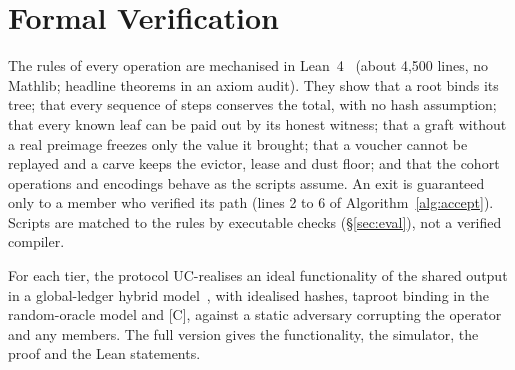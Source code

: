 \section{Formal Verification}\label{sec:proved}

The rules of every operation are mechanised in Lean~4~\cite{lean4}
(about 4{,}500 lines, no Mathlib; \LeanTheoremCount{} headline theorems
in an axiom audit). They show that a root binds its tree; that every
sequence of steps conserves the total, with no hash assumption; that
every known leaf can be paid out by its honest witness; that a graft
without a real preimage freezes only the value it brought; that a
voucher cannot be replayed and a carve keeps the evictor, lease and dust
floor; and that the cohort operations and encodings behave as the
scripts assume. An exit is guaranteed only to a member who verified its
path (lines 2 to 6 of Algorithm~\ref{alg:accept}). Scripts are matched to the rules by executable checks
(\S\ref{sec:eval}), not a verified compiler.

For each tier, the protocol UC-realises an ideal functionality of the
shared output in a global-ledger hybrid model~\cite{canettiUC,bmtz17},
with idealised hashes, taproot binding in the random-oracle model and
[C], against a static adversary corrupting the operator and any members.
The full version gives the functionality, the simulator, the proof and
the Lean statements.
